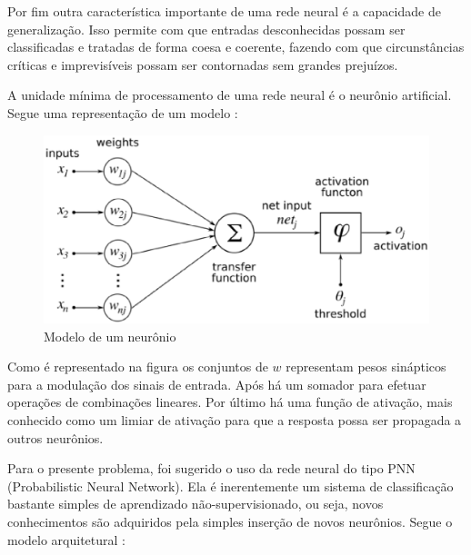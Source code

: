 Por fim outra característica importante de uma rede neural é a capacidade de generalização. Isso permite com que entradas desconhecidas possam ser classificadas e tratadas de forma coesa e coerente, fazendo com que circunstâncias críticas e imprevisíveis possam ser contornadas sem grandes prejuízos.

A unidade mínima de processamento de uma rede neural é o neurônio artificial. Segue uma representação de um modelo \cite{haykin2009neural}:

\begin{figure}[h]
	\centering
		\includegraphics[scale=0.7]{figuras/neuron.eps}
	\caption{Modelo de um neurônio}
\end{figure}

Como é representado na figura os conjuntos de $w$ representam pesos sinápticos para a modulação dos sinais de entrada. Após há um somador para efetuar operações de combinações lineares. Por último há uma função de ativação, mais conhecido como um limiar de ativação para que a resposta possa ser propagada a outros neurônios.

\newpage
Para o presente problema, foi sugerido o uso da rede neural do tipo PNN (Probabilistic Neural Network). Ela é inerentemente um sistema de classificação bastante simples de aprendizado não-supervisionado, ou seja, novos conhecimentos são adquiridos pela simples inserção de novos neurônios. Segue o modelo arquitetural \cite{neuron-arq}:

